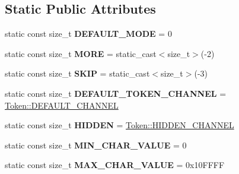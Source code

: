 \subsection*{Static Public Attributes}
\begin{DoxyCompactItemize}
\item 
\mbox{\label{classantlr4_1_1Lexer_a0de0f60a69f9c80ce9f94611e367c3be}} 
static const size\+\_\+t {\bfseries D\+E\+F\+A\+U\+L\+T\+\_\+\+M\+O\+DE} = 0
\item 
\mbox{\label{classantlr4_1_1Lexer_abfb20aa1e7dd10fc7eee9be2222af82b}} 
static const size\+\_\+t {\bfseries M\+O\+RE} = static\+\_\+cast$<$size\+\_\+t$>$(-\/2)
\item 
\mbox{\label{classantlr4_1_1Lexer_ad8bd392012efd2339b7acbe7a383d216}} 
static const size\+\_\+t {\bfseries S\+K\+IP} = static\+\_\+cast$<$size\+\_\+t$>$(-\/3)
\item 
\mbox{\label{classantlr4_1_1Lexer_ad7dde3f1afa37e6f4bd9de314720588e}} 
static const size\+\_\+t {\bfseries D\+E\+F\+A\+U\+L\+T\+\_\+\+T\+O\+K\+E\+N\+\_\+\+C\+H\+A\+N\+N\+EL} = \hyperlink{classantlr4_1_1Token_a699cbc56affbddc079561e175cba8435}{Token\+::\+D\+E\+F\+A\+U\+L\+T\+\_\+\+C\+H\+A\+N\+N\+EL}
\item 
\mbox{\label{classantlr4_1_1Lexer_aa1872e72875f6962d99e6affe8dbec15}} 
static const size\+\_\+t {\bfseries H\+I\+D\+D\+EN} = \hyperlink{classantlr4_1_1Token_af9bee187eba93f908d76d6406883424a}{Token\+::\+H\+I\+D\+D\+E\+N\+\_\+\+C\+H\+A\+N\+N\+EL}
\item 
\mbox{\label{classantlr4_1_1Lexer_ab93986810ee28e8dfaa0e54db36ef956}} 
static const size\+\_\+t {\bfseries M\+I\+N\+\_\+\+C\+H\+A\+R\+\_\+\+V\+A\+L\+UE} = 0
\item 
\mbox{\label{classantlr4_1_1Lexer_a226522030449095f36abf517f315c2d7}} 
static const size\+\_\+t {\bfseries M\+A\+X\+\_\+\+C\+H\+A\+R\+\_\+\+V\+A\+L\+UE} = 0x10\+F\+F\+FF
\end{DoxyCompactItemize}
